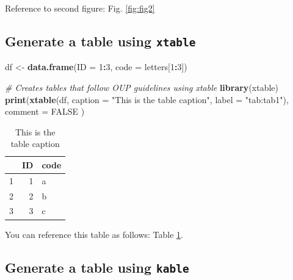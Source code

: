 \documentclass[12pt,halfline,a4paper,]{ouparticle}
\newenvironment{Shaded}{\begin{snugshade}}{\end{snugshade}}
\newcommand{\AttributeTok}[1]{\textcolor[rgb]{0.13,0.29,0.53}{#1}}
\newcommand{\CommentTok}[1]{\textcolor[rgb]{0.56,0.35,0.01}{\textit{#1}}}
\newcommand{\ConstantTok}[1]{\textcolor[rgb]{0.56,0.35,0.01}{#1}}
\newcommand{\DecValTok}[1]{\textcolor[rgb]{0.00,0.00,0.81}{#1}}
\newcommand{\FunctionTok}[1]{\textcolor[rgb]{0.13,0.29,0.53}{\textbf{#1}}}
\newcommand{\NormalTok}[1]{#1}
\newcommand{\OtherTok}[1]{\textcolor[rgb]{0.56,0.35,0.01}{#1}}
\newcommand{\SpecialCharTok}[1]{\textcolor[rgb]{0.81,0.36,0.00}{\textbf{#1}}}
\newcommand{\StringTok}[1]{\textcolor[rgb]{0.31,0.60,0.02}{#1}}
\begin{document}
Reference to second figure: Fig. \ref{fig:fig2}

\hypertarget{generate-a-table-using-xtable}{%
\subsection{\texorpdfstring{Generate a table using
\texttt{xtable}}{Generate a table using xtable}}\label{generate-a-table-using-xtable}}

\begin{Shaded}
\begin{Highlighting}[]
\NormalTok{df }\OtherTok{\textless{}{-}} \FunctionTok{data.frame}\NormalTok{(}\AttributeTok{ID =} \DecValTok{1}\SpecialCharTok{:}\DecValTok{3}\NormalTok{, }\AttributeTok{code =}\NormalTok{ letters[}\DecValTok{1}\SpecialCharTok{:}\DecValTok{3}\NormalTok{])}

\CommentTok{\# Creates tables that follow OUP guidelines using xtable}
\FunctionTok{library}\NormalTok{(xtable)}
\FunctionTok{print}\NormalTok{(}\FunctionTok{xtable}\NormalTok{(df, }\AttributeTok{caption =} \StringTok{"This is the table caption"}\NormalTok{, }\AttributeTok{label =} \StringTok{"tab:tab1"}\NormalTok{),}
  \AttributeTok{comment =} \ConstantTok{FALSE}
\NormalTok{)}
\end{Highlighting}
\end{Shaded}

\begin{table}[ht]
\centering
\begin{tabular}{rrl}
  \hline
 & ID & code \\ 
  \hline
1 &   1 & a \\ 
  2 &   2 & b \\ 
  3 &   3 & c \\ 
   \hline
\end{tabular}
\caption{This is the table caption} 
\label{tab:tab1}
\end{table}

You can reference this table as follows: Table \ref{tab:tab1}.

\hypertarget{generate-a-table-using-kable}{%
\subsection{\texorpdfstring{Generate a table using
\texttt{kable}}{Generate a table using kable}}\label{generate-a-table-using-kable}}
\end{document}
